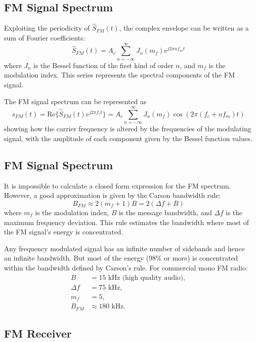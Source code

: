 \subsection*{FM Signal Spectrum}

Exploiting the periodicity of \( \hat{S}_{FM}(t) \), the complex envelope can be written as a sum of Fourier coefficients:
\[
\hat{S}_{FM}(t) = A_c \sum_{n=-\infty}^{\infty} J_n(m_f) e^{j 2\pi n f_m t}
\]
where \( J_n \) is the Bessel function of the first kind of order \( n \), and \( m_f \) is the modulation index. This series represents the spectral components of the FM signal.

The FM signal spectrum can be represented as
\[
s_{FM}(t) = \text{Re}\{ \hat{S}_{FM}(t) e^{j 2\pi f_c t} \} = A_c \sum_{n=-\infty}^{\infty} J_n(m_f) \cos(2\pi (f_c + n f_m) t)
\]
showing how the carrier frequency is altered by the frequencies of the modulating signal, with the amplitude of each component given by the Bessel function values.


\subsection*{FM Signal Spectrum}

It is impossible to calculate a closed form expression for the FM spectrum. However, a good approximation is given by the Carson bandwidth rule:
\[ B_{FM} \approx 2(m_f + 1)B = 2(\Delta f + B) \]
where \( m_f \) is the modulation index, \( B \) is the message bandwidth, and \( \Delta f \) is the maximum frequency deviation. This rule estimates the bandwidth where most of the FM signal's energy is concentrated.

Any frequency modulated signal has an infinite number of sidebands and hence an infinite bandwidth. But most of the energy (98\% or more) is concentrated within the bandwidth defined by Carson's rule. For commercial mono FM radio:
\begin{align*}
B &= 15 \text{ kHz (high quality audio)}, \\
\Delta f &= 75 \text{ kHz}, \\
m_f &= 5, \\
B_{FM} &\approx 180 \text{ kHz}.
\end{align*}

\subsection*{FM Receiver}

